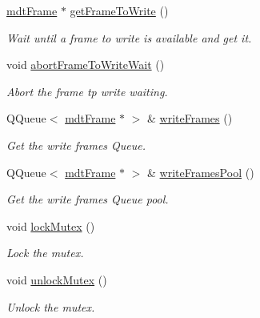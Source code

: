 \begin{DoxyCompactItemize}
\hyperlink{classmdt_frame}{mdtFrame} $\ast$ \hyperlink{classmdt_abstract_port_a6c5ebd4451aec959efc4e71ab1b13941}{getFrameToWrite} ()
\begin{DoxyCompactList}\small\item\em Wait until a frame to write is available and get it. \end{DoxyCompactList}\item 
void \hyperlink{classmdt_abstract_port_ae67c815f68317c70e398eaa86622af6b}{abortFrameToWriteWait} ()
\begin{DoxyCompactList}\small\item\em Abort the frame tp write waiting. \end{DoxyCompactList}\item 
QQueue$<$ \hyperlink{classmdt_frame}{mdtFrame} $\ast$ $>$ \& \hyperlink{classmdt_abstract_port_a4fed10be147dfce6ca315467ff3fb968}{writeFrames} ()
\begin{DoxyCompactList}\small\item\em Get the write frames Queue. \end{DoxyCompactList}\item 
QQueue$<$ \hyperlink{classmdt_frame}{mdtFrame} $\ast$ $>$ \& \hyperlink{classmdt_abstract_port_abf093b67fddebffa4f3c52277b9a8cf7}{writeFramesPool} ()
\begin{DoxyCompactList}\small\item\em Get the write frames Queue pool. \end{DoxyCompactList}\item 
\hypertarget{classmdt_abstract_port_a6bf2ecdcf894da3929a22eb8793a9fe3}{
void \hyperlink{classmdt_abstract_port_a6bf2ecdcf894da3929a22eb8793a9fe3}{lockMutex} ()}
\label{classmdt_abstract_port_a6bf2ecdcf894da3929a22eb8793a9fe3}

\begin{DoxyCompactList}\small\item\em Lock the mutex. \end{DoxyCompactList}\item 
\hypertarget{classmdt_abstract_port_a3523c72a06e4d950338f91e56c286e84}{
void \hyperlink{classmdt_abstract_port_a3523c72a06e4d950338f91e56c286e84}{unlockMutex} ()}
\label{classmdt_abstract_port_a3523c72a06e4d950338f91e56c286e84}

\begin{DoxyCompactList}\small\item\em Unlock the mutex. \end{DoxyCompactList}\end{DoxyCompactItemize}
